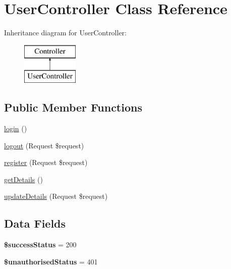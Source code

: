 \hypertarget{class_app_1_1_http_1_1_controllers_1_1_a_p_i_1_1_user_controller}{}\section{User\+Controller Class Reference}
\label{class_app_1_1_http_1_1_controllers_1_1_a_p_i_1_1_user_controller}
Inheritance diagram for User\+Controller\+:\begin{figure}[H]
\begin{center}
\leavevmode
\includegraphics[height=2.000000cm]{class_app_1_1_http_1_1_controllers_1_1_a_p_i_1_1_user_controller}
\end{center}
\end{figure}
\subsection*{Public Member Functions}
\begin{DoxyCompactItemize}
\item 
\mbox{\hyperlink{class_app_1_1_http_1_1_controllers_1_1_a_p_i_1_1_user_controller_aa311da27ba5706f5710cea7706c8eae1}{login}} ()
\item 
\mbox{\hyperlink{class_app_1_1_http_1_1_controllers_1_1_a_p_i_1_1_user_controller_a5b2715b64f1825c3c1e3a92ee2b695fc}{logout}} (Request \$request)
\item 
\mbox{\hyperlink{class_app_1_1_http_1_1_controllers_1_1_a_p_i_1_1_user_controller_ad354167fc268b59819f72a28e6be0987}{register}} (Request \$request)
\item 
\mbox{\hyperlink{class_app_1_1_http_1_1_controllers_1_1_a_p_i_1_1_user_controller_a67bcdf2ca053bbc348983454239ea980}{get\+Details}} ()
\item 
\mbox{\hyperlink{class_app_1_1_http_1_1_controllers_1_1_a_p_i_1_1_user_controller_af791ef7277ca1b94381e076ee88ab552}{update\+Details}} (Request \$request)
\end{DoxyCompactItemize}
\subsection*{Data Fields}
\begin{DoxyCompactItemize}
\item 
\mbox{\label{class_app_1_1_http_1_1_controllers_1_1_a_p_i_1_1_user_controller_a4fde01aada3b602338d7002a598a8763}} 
{\bfseries \$success\+Status} = 200
\item 
\mbox{\label{class_app_1_1_http_1_1_controllers_1_1_a_p_i_1_1_user_controller_ab7d5fb8f13267c859829854b90c6f50d}} 
{\bfseries \$unauthorised\+Status} = 401
\end{DoxyCompactItemize}


